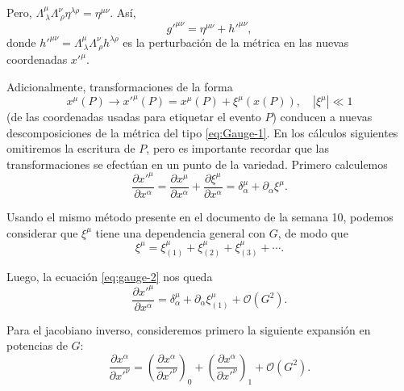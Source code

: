 \documentclass[letterpaper,11pt]{article}
\begin{document}
Pero, $\Lambda^{\mu}_{\ \lambda} \Lambda^{\nu}_{\ \rho}\eta^{\lambda \rho} = \eta^{\mu\nu} $. Así,
\begin{equation}
g'^{\mu\nu} = \eta^{\mu\nu} + h'^{\mu\nu},
\end{equation}
donde $h'^{\mu\nu} = \Lambda^{\mu}_{\ \lambda} \Lambda^{\nu}_{\ \rho} h^{\lambda\rho}$ es la perturbación de la métrica en las nuevas coordenadas $x'^{\mu}$.

Adicionalmente, transformaciones de la forma
\begin{equation}
x^{\mu}(P) \rightarrow x'^{\mu}(P) = x^{\mu}(P) + \xi^{\mu}(x(P)), \quad |\xi^{\mu}| \ll 1 \label{eq:gauge-1.5}
\end{equation}
(de las coordenadas usadas para etiquetar el evento $P$) conducen a nuevas descomposiciones de la métrica del tipo \eqref{eq:Gauge-1}. En los cálculos siguientes omitiremos la escritura de $P$, pero es importante recordar que las transformaciones se efectúan en un punto de la variedad. Primero calculemos
\begin{equation}
\frac{\partial x'^{\mu}}{\partial x^{\alpha}} = \frac{\partial x^{\mu}}{\partial x^{\alpha}} + \frac{\partial \xi^{\mu}}{\partial x^{\alpha}} = \delta^{\mu}_{\alpha} + \partial_{\alpha} \xi^{\mu}. \label{eq:gauge-2}
\end{equation}

Usando el mismo método presente en el documento de la semana 10, podemos considerar que $\xi^{\mu}$ tiene una dependencia general con $G$, de modo que
\begin{equation}
\xi^{\mu} = \xi_{(1)}^{\mu} + \xi_{(2)}^{\mu} + \xi_{(3)}^{\mu} + \cdots.
\end{equation}

Luego, la ecuación \eqref{eq:gauge-2} nos queda
\begin{equation}
\frac{\partial x'^{\mu}}{\partial x^{\alpha}} = \delta^{\mu}_{\alpha} + \partial_{\alpha} \xi_{(1)}^{\mu} + \mathcal{O}(G^2). \label{eq:gauge-3}
\end{equation}

Para el jacobiano inverso, consideremos primero la siguiente expansión en potencias de $G$:
\begin{equation}
\frac{\partial x^{\alpha}}{\partial x'^{\nu}} = \left(\frac{\partial x^{\alpha}}{\partial x'^{\nu}}\right)_0 + \left(\frac{\partial x^{\alpha}}{\partial x'^{\nu}}\right)_1 + \mathcal{O}(G^2).
\end{equation}
\end{document}
